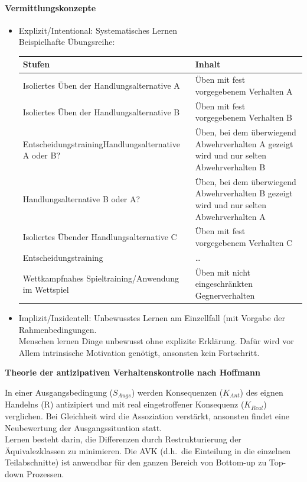 \paragraph{Vermittlungskonzepte}
\begin{itemize}
  \item Explizit/Intentional: Systematisches Lernen\\
    Beispielhafte Übungsreihe:\\
    \begin{tabular}{m{} | m{}}
      Stufen & Inhalt \\ \hline
      Isoliertes Üben der Handlungsalternative A & Üben mit fest vorgegebenem Verhalten A \\ \hline
      Isoliertes Üben der Handlungsalternative B & Üben mit fest vorgegebenem Verhalten B \\ \hline
      Entscheidungstraining\newline Handlungsalternative A oder B? & Üben, bei dem überwiegend Abwehrverhalten A \newline gezeigt wird und nur selten Abwehrverhalten B \\ \hline
      Handlungsalternative B oder A? & Üben, bei dem überwiegend Abwehrverhalten B\newline
      gezeigt wird und nur selten Abwehrverhalten A \\ \hline
      Isoliertes Übender Handlungsalternative C & Üben mit fest vorgegebenem Verhalten C \\ \hline
      Entscheidungstraining & \ldots \\ \hline
      Wettkampfnahes Spieltraining/Anwendung im Wettspiel & Üben mit nicht eingeschränkten Gegnerverhalten \\
    \end{tabular}
  \item Implizit/Inzidentell: Unbewusstes Lernen am Einzellfall (mit Vorgabe der Rahmenbedingungen.\\
    Menschen lernen Dinge unbewusst ohne explizite Erklärung. Dafür wird vor Allem intrinsische Motivation genötigt, ansonsten kein Fortschritt.
\end{itemize}
\textbf{Theorie der antizipativen Verhaltenskontrolle nach Hoffmann}\newline
  \begin{minipage}{.5\textwidth}
  In einer Ausgangsbedingung ($S_{Augs}$) werden Konsequenzen ($K_{Ant}$) des eignen Handelns (R) antizipiert und mit real eingetroffener Konsequenz ($K_{Real}$) verglichen.
  Bei Gleichheit wird die Assoziation verstärkt, ansonsten findet eine Neubewertung der Ausgangssituation statt.\\
  Lernen besteht darin, die Differenzen durch Restrukturierung der Äquivalezklassen zu minimieren.
  Die AVK (d.h.\ die Einteilung in die einzelnen Teilabschnitte) ist anwendbar für den ganzen Bereich von Bottom-up zu Top-down Prozessen.
  \end{minipage}
